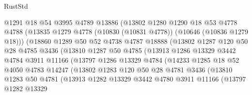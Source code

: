 \begin{lexlean}{RustStd}
\begin{coremodule}
                    @1291
                    @18
                    @54
                    @3995
                    @4789
                    @13886
                    (@13802
                      @1280
                      @1290
                      @18
                      @53
                      @4778
                      @4788
                      (@13835 @1279 @4778 (@10830 (@10831 @4778)) (@10646 (@10836 @1279 @18)))
                      (@18860
                        @1289
                        @50
                        @52
                        @4738
                        @4787
                        @18888
                        (@13802
                          @1287
                          @120
                          @50
                          @28
                          @4785
                          @3436
                          (@13810
                            @1287
                            @50
                            @4785
                            (@13913
                              @1286
                              @13329
                              @3442
                              @4784
                              @3911
                              @11166
                              (@13797
                                @1286
                                @13329
                                @4784
                                (@14233
                                  @1285
                                  @18
                                  @52
                                  @4050
                                  @4783
                                  @14247
                                  (@13802
                                    @1283
                                    @120
                                    @50
                                    @28
                                    @4781
                                    @3436
                                    (@13810
                                      @1283
                                      @50
                                      @4781
                                      (@13913
                                        @1282
                                        @13329
                                        @3442
                                        @4780
                                        @3911
                                        @11166
                                        (@13797
                                          @1282
                                          @13329

\end{coremodule}
\end{lexlean}
